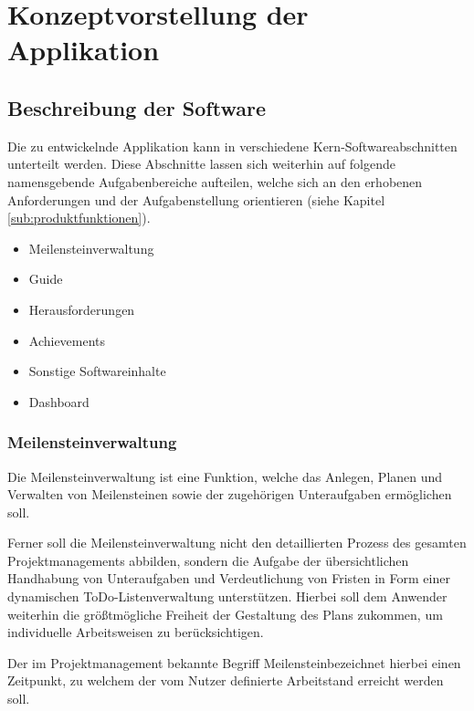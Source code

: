 \documentclass[bibliography=totoc,listof=totoc,BCOR=5mm,DIV=12,oneside]{scrbook}
\begin{document}
\newpage
\chapter{Konzeptvorstellung der Applikation} \label{chap:konzept}

\section{Beschreibung der Software}
\par Die zu entwickelnde Applikation kann in verschiedene Kern-Softwareabschnitten unterteilt werden. Diese Abschnitte lassen sich weiterhin auf folgende namensgebende Aufgabenbereiche aufteilen, welche sich an den erhobenen Anforderungen und der Aufgabenstellung orientieren (siehe Kapitel \ref{sub:produktfunktionen}).

\begin{itemize}
\item Meilensteinverwaltung
\item Guide
\item Herausforderungen
\item Achievements
\item Sonstige Softwareinhalte
\item Dashboard
\end{itemize}

\newpage
\subsection{Meilensteinverwaltung}
\par Die Meilensteinverwaltung ist eine Funktion, welche das Anlegen, Planen und Verwalten von Meilensteinen sowie der zugehörigen Unteraufgaben ermöglichen soll. 
\par Ferner soll die Meilensteinverwaltung nicht den detaillierten Prozess des gesamten Projektmanagements abbilden, sondern die Aufgabe der übersichtlichen Handhabung von Unteraufgaben und Verdeutlichung von Fristen in Form einer dynamischen ToDo-Listenverwaltung unterstützen. Hierbei soll dem Anwender weiterhin die größtmögliche Freiheit der Gestaltung des Plans zukommen, um individuelle Arbeitsweisen zu berücksichtigen. 
\par \bigskip Der im Projektmanagement bekannte Begriff \grqq Meilenstein\grqq bezeichnet hierbei einen Zeitpunkt, zu welchem der vom Nutzer definierte Arbeitstand erreicht werden soll.
\end{document}
